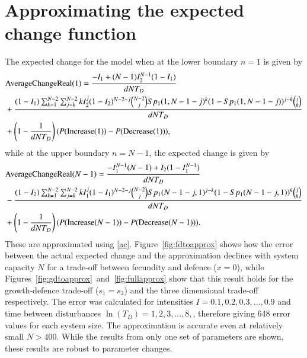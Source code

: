  \section{Approximating the expected change function}
 \label{appapproximations}
 The expected change for the model when at the lower boundary $n=1$ is given by
 \begin{align}
\label{acreal1difi}&\text{AverageChangeReal}(1)=\frac{-I_1+(N-1)I_2^{N-1}(1-I_1)}{dNT_D}\\
&+\frac{(1-I_1)\sum_{k=1}^{N-2}\sum_{j=k}^{N-2}k I_2^j(1-I_2)^{N-2-j}{N-2\choose j} Sp_1(1,N-1-j)^k(1-Sp_1(1,N-1-j))^{j-k} {j \choose k}}{dNT_D} \notag \\
 &+ \left(1-\frac{1}{dNT_D}\right)(P(\text{Increase}(1))-P(\text{Decrease}(1))), \notag
 \end{align}
 while at the upper boundary $n=N-1$, the expected change is given by
\begin{align}
 \label{acrealtotdifi}&\text{AverageChangeReal}(N-1)= \frac{-I_1^{N-1}(N-1) +I_2(1-I_1^{N-1})}{dNT_D} \\
 &-\frac{(1-I_2)\sum_{k=1}^{N-2}\sum_{j=k}^{N-2}k I_1^j(1-I_1)^{N-2-j}{N-2\choose j} Sp_1(N-1-j,1)^{j-k}(1-Sp_1(N-1-j,1))^{k} {j \choose k}}{dNT_D} \notag \\
 &+ \left(1-\frac{1}{dNT_D}\right)(P(\text{Increase}(N-1))-P(\text{Decrease}(N-1))). \notag
  \end{align} 
These are approximated using \eqref{ac}. Figure~\ref{fig:fdtoapprox} shows how the error between the actual expected change and the approximation declines with system capacity $N$ for a trade-off between fecundity and defence ($x=0$), while Figures~\ref{fig:gdtoapprox}~and~\ref{fig:fullapprox} show that this result holds for the growth-defence trade-off ($s_1=s_2$) and the three dimensional trade-off respectively. The error was calculated for intensities $I=0.1,0.2,0.3,...,0.9$ and time between disturbances $\ln(T_D)=1,2,3,...,8,$, therefore giving 648 error values for each system size. The approximation is accurate even at relatively small $N>400$. While the results from only one set of parameters are shown, these results are robust to parameter changes.
